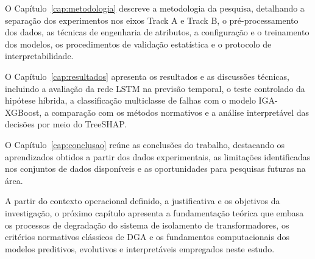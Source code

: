 O Capítulo~\ref{cap:metodologia} descreve a metodologia da pesquisa, detalhando a separação dos experimentos nos eixos Track A e Track B, o pré-processamento dos dados, as técnicas de engenharia de atributos, a configuração e o treinamento dos modelos, os procedimentos de validação estatística e o protocolo de interpretabilidade.

O Capítulo~\ref{cap:resultados} apresenta os resultados e as discussões técnicas, incluindo a avaliação da rede LSTM na previsão temporal, o teste controlado da hipótese híbrida, a classificação multiclasse de falhas com o modelo IGA-XGBoost, a comparação com os métodos normativos e a análise interpretável das decisões por meio do TreeSHAP.

O Capítulo~\ref{cap:conclusao} reúne as conclusões do trabalho, destacando os aprendizados obtidos a partir dos dados experimentais, as limitações identificadas nos conjuntos de dados disponíveis e as oportunidades para pesquisas futuras na área.

A partir do contexto operacional definido, a justificativa e os objetivos da investigação, o próximo capítulo apresenta a fundamentação teórica que embasa os processos de degradação do sistema de isolamento de transformadores, os critérios normativos clássicos de DGA e os fundamentos computacionais dos modelos preditivos, evolutivos e interpretáveis empregados neste estudo.